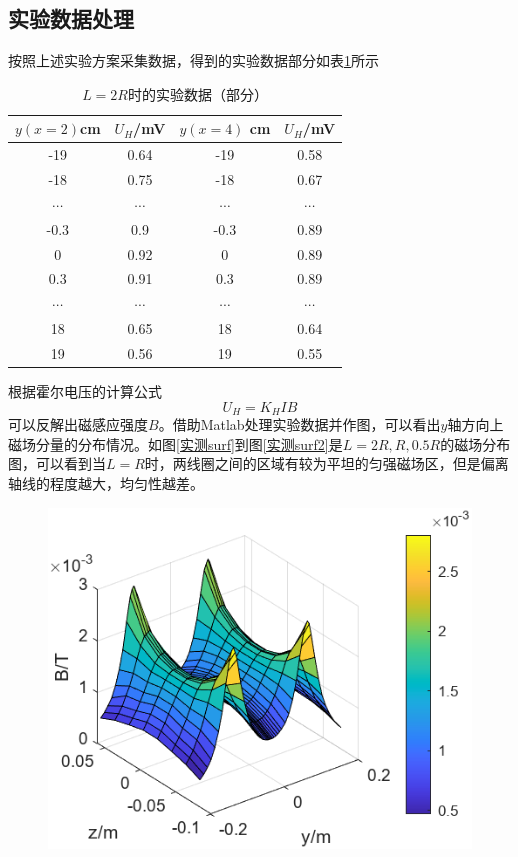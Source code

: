 \documentclass{ctexart}
\begin{document}
\begin{multicols}{2}
\subsection{实验数据处理}
按照上述实验方案采集数据，得到的实验数据部分如表\ref{实验数据}所示
\begin{table}[H]
    \centering
    \caption{$L=2R$时的实验数据（部分）}
    \begin{tabular}{cccc}
        \hline
        $y(x=2)$cm & $U_H$/mV & $y(x=4)$ cm& $U_H$/mV \\ \hline
        -19 & 0.64 & -19&	0.58\\
        -18	&0.75&	-18	&0.67\\
        $\cdots$ &$\cdots$ &$\cdots$ &$\cdots$\\
        -0.3 &	0.9	&-0.3	&0.89\\
        0	&0.92	&0	&0.89\\
        0.3	&0.91	&0.3&	0.89\\
        $\cdots$ &$\cdots$ &$\cdots$ &$\cdots$\\
        18&	0.65	&18	&0.64\\
        19&	0.56	&19&	0.55\\ \hline
    \end{tabular}
    \label{实验数据}   
\end{table}
根据霍尔电压的计算公式
\begin{equation}
    U_H=K_HIB
\end{equation}
可以反解出磁感应强度$B$。借助Matlab处理实验数据并作图，可以看出$y$轴方向上磁场分量的分布情况。如图\ref{实测surf}到图\ref{实测surf2}是$L=2R,R,0.5R$的磁场分布图，可以看到当$L=R$时，两线圈之间的区域有较为平坦的匀强磁场区，但是偏离轴线的程度越大，均匀性越差。
\begin{figure}[H]
    \centering
    \includegraphics[scale=1]{./pic/realsurf2R.png}

\end{figure}
\end{multicols}
\end{document}
